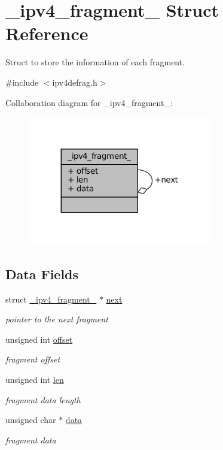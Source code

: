 \hypertarget{struct__ipv4__fragment__}{\section{\-\_\-ipv4\-\_\-fragment\-\_\- Struct Reference}
\label{struct__ipv4__fragment__}
}


Struct to store the information of each fragment.  




{\ttfamily \#include $<$ipv4defrag.\-h$>$}



Collaboration diagram for \-\_\-ipv4\-\_\-fragment\-\_\-\-:
\nopagebreak
\begin{figure}[H]
\begin{center}
\leavevmode
\includegraphics[width=227pt]{struct__ipv4__fragment____coll__graph}
\end{center}
\end{figure}
\subsection*{Data Fields}
\begin{DoxyCompactItemize}
\item 
struct \hyperlink{struct__ipv4__fragment__}{\-\_\-ipv4\-\_\-fragment\-\_\-} $\ast$ \hyperlink{struct__ipv4__fragment___a909d1ac6593a89af1237e515062678a9}{next}
\begin{DoxyCompactList}\small\item\em pointer to the next fragment \end{DoxyCompactList}\item 
unsigned int \hyperlink{struct__ipv4__fragment___a29b5297d3393519050e3126c4cb07c1c}{offset}
\begin{DoxyCompactList}\small\item\em fragment offset \end{DoxyCompactList}\item 
unsigned int \hyperlink{struct__ipv4__fragment___a77124bd5f7e31e6fffc19f335da0c23f}{len}
\begin{DoxyCompactList}\small\item\em fragment data length \end{DoxyCompactList}\item 
unsigned char $\ast$ \hyperlink{struct__ipv4__fragment___ac24cea2bfcc927fd29bc74d1086707d8}{data}
\begin{DoxyCompactList}\small\item\em fragment data \end{DoxyCompactList}\end{DoxyCompactItemize}



